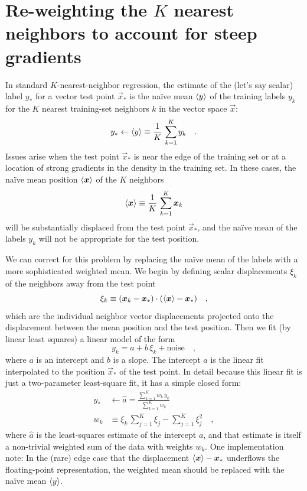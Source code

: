 \documentclass[modern]{aastex63}
\begin{document}
\appendix

\section{Re-weighting the $K$ nearest neighbors to account for steep gradients}
\label{app:knn-weights}

In standard $K$-nearest-neighbor regression, the estimate of the
(let's say scalar) label $y_\ast$ for a vector test point
$\vec{x}_\ast$ is the na\"ive mean $\left\langle y \right\rangle$ of the training labels $y_k$ for the $K$
nearest training-set neighbors $k$ in the vector space $\vec{x}$:
\begin{equation}
  y_\ast \leftarrow \mean{y} \equiv \frac{1}{K}\,\sum_{k=1}^K y_k
  \quad .
\end{equation}
Issues arise when the test point $\vec{x}_\ast$ is near the edge of
the training set or at a location of strong gradients in the density
in the training set.
In these cases, the na\"ive mean position $\left\langle \boldsymbol{x} \right\rangle$ of the $K$ neighbors
\begin{equation}
  \mean{\vec{x}} \equiv \frac{1}{K}\,\sum_{k=1}^K \vec{x}_k
\end{equation}
will be substantially displaced from the test point $\vec{x}_\ast$, and
the na\"ive mean of the labels $y_k$ will not be appropriate for the
test position.

We can correct for this problem by replacing the na\"ive mean of the labels
with a more sophisticated weighted mean.
We begin by defining scalar displacements $\xi_k$ of the neighbors away
from the test point
\begin{equation}
  \xi_k \equiv (\vec{x}_k - \vec{x}_\ast)\cdot(\mean{\vec{x}} - \vec{x}_\ast)
  \quad ,
\end{equation}
which are the individual neighbor vector displacements
projected onto the displacement between
the mean position and the test position.
Then we fit (by linear least squares) a linear model of the form
\begin{equation}
  y_k = a + b\,\xi_k + \mbox{noise}
  \quad ,
\end{equation}
where $a$ is an intercept and $b$ is a slope.
The intercept $a$ is the linear
fit interpolated to the position $\vec{x}_\ast$ of the test point.
In detail because this linear fit is just a two-parameter least-square fit,
it has a simple closed form:
\begin{align}
  y_\ast & \leftarrow \hat{a} = \frac{\sum_{k=1}^K w_k\,y_k}{\sum_{k=1}^K w_k}
  \\
  w_k & \equiv \xi_k\,\sum_{j=1}^K \xi_j - \sum_{j=1}^K \xi_j^2
  \quad ,
\end{align}
where $\hat{a}$ is the least-squares estimate of the intercept $a$, and that
estimate is itself a non-trivial weighted sum of the data with weights $w_k$.
One implementation note:
In the (rare) edge case that the displacement
$\left\langle \boldsymbol{x} \right\rangle-\boldsymbol{x}_\ast$ underflows the
floating-point representation, the weighted mean should be replaced with the
na\"ive mean $\left\langle y \right\rangle$.
\end{document}
